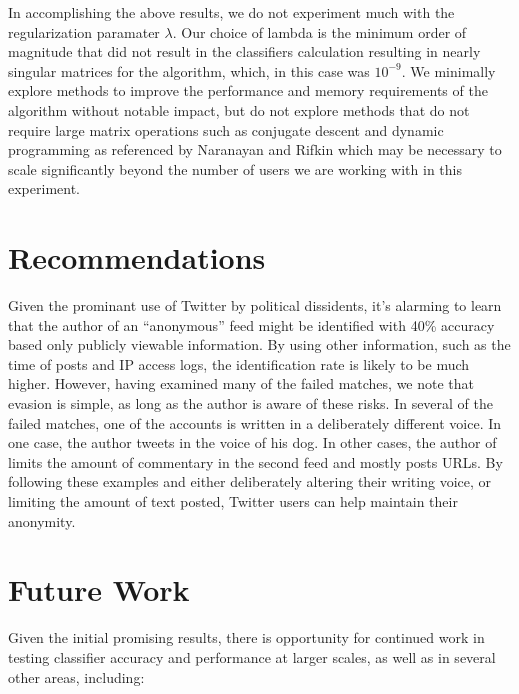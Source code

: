 \documentclass[10pt, conference, compsocconf]{IEEEtran}
\begin{document}
In accomplishing the above results, we do not experiment much with the
regularization paramater $\lambda$.  Our choice of lambda is the
minimum order of magnitude that did not result in the classifiers
calculation resulting in nearly singular matrices for the algorithm,
which, in this case was $10^{-9}$.  We minimally explore methods to
improve the performance and memory requirements of the algorithm
without notable impact, but do not explore methods that do not require
large matrix operations such as conjugate descent and dynamic
programming as referenced by Naranayan and Rifkin \cite{Rifkin} which
may be necessary to scale significantly beyond the number of users we
are working with in this experiment.

\section {Recommendations}

Given the prominant use of Twitter by political dissidents, it's
alarming to learn that the author of an ``anonymous'' feed might be
identified with 40\% accuracy based only publicly viewable
information. By using other information, such as the time of posts and
IP access logs, the identification rate is likely to be much
higher. However, having examined many of the failed matches, we note
that evasion is simple, as long as the author is aware of these
risks. In several of the failed matches, one of the accounts is
written in a deliberately different voice. In one case, the author
tweets in the voice of his dog. In other cases, the author of limits
the amount of commentary in the second feed and mostly posts URLs. By
following these examples and either deliberately altering their writing
voice, or limiting the amount of text posted, Twitter users can help
maintain their anonymity.

\section {Future Work}

Given the initial promising results, there is opportunity for
continued work in testing classifier accuracy and performance at
larger scales, as well as in several other areas, including:
\end{document}
